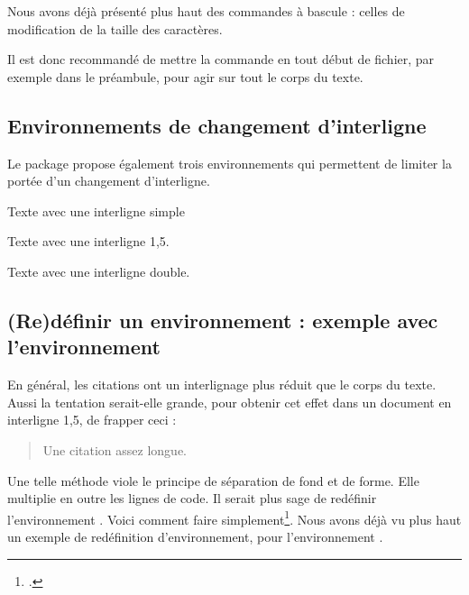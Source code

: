 Nous avons déjà présenté plus haut des commandes à bascule : celles de modification de la taille des caractères.

Il est donc recommandé de mettre la commande  en tout début de fichier, par exemple dans le préambule, pour agir sur tout le corps du texte.

\subsection{Environnements de changement d'interligne}

Le package  propose également trois environnements qui permettent de limiter la portée d'un changement d'interligne.

\begin{latexcode}
\begin{singlespace}
Texte avec une interligne simple
\end{singlespace}
\begin{onehalfspace}
Texte avec une interligne 1,5.
\end{onehalfspace}
\begin{doublespace}
Texte avec une interligne double.
\end{doublespace}
\end{latexcode}

\subsection[Rédéfinir un environnement : quotation]{(Re)définir un environnement : exemple avec l'environnement }

En général, les citations ont un interlignage plus réduit que le corps du texte. Aussi la tentation serait-elle grande, pour obtenir cet effet dans un document en interligne 1,5, de frapper ceci :

\begin{latexcode}
\begin{singlespace}
\begin{quotation}
Une citation assez longue.
\end{quotation}
\end{singlespace}
\end{latexcode}

Une telle méthode viole le principe de séparation de fond et de forme. Elle multiplie en outre les lignes de code. Il serait plus sage de redéfinir l'environnement . Voici comment faire simplement\footcite[Nous nous somme basés sur la classe  :][]{bredele}. Nous avons déjà vu plus haut un exemple de redéfinition d'environnement, pour l'environnement .

